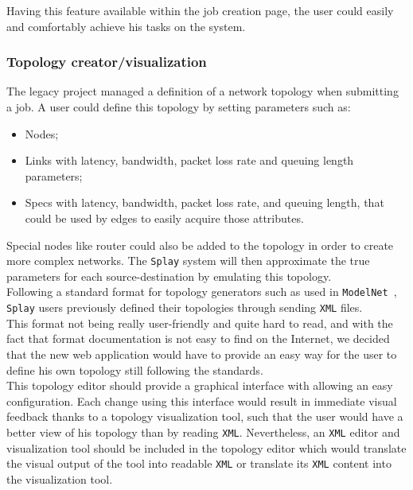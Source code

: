 \documentclass{eplmastersthesis}
\begin{document}
          Having this feature available within the job creation page, the user
          could easily and comfortably achieve his tasks on the system.

        \subsubsection{Topology creator/visualization}

          The legacy project managed a definition of a network topology when
          submitting a job. A user could define this topology by setting
          parameters such as:

          \begin{itemize}
            \item Nodes;
            \item Links with latency, bandwidth, packet loss rate and queuing
            length parameters;
            \item Specs with latency, bandwidth, packet loss rate, and queuing
            length, that could be used by edges to easily acquire those
            attributes.
          \end{itemize}

          Special nodes like router could also be added to the topology in order
          to create more complex networks. The \texttt{Splay} system will then
          approximate the true parameters for each source-destination by
          emulating this topology.\\

          Following a standard format for topology generators such as
          used in \texttt{ModelNet}~\cite{ModelNet}, \texttt{Splay} users previously
          defined their topologies through sending \texttt{XML} files.\\
          This format not being really user-friendly and quite hard to read,
          and with the fact that format documentation is not easy to find
          on the Internet, we decided that the new web application would have
          to provide an easy way for the user to define his own topology
          still following the standards.\\

          This topology editor should provide a graphical interface with
          allowing an easy configuration. Each change using this interface
          would result in immediate visual feedback thanks to a topology
          visualization tool, such that the user would have a better view of
          his topology than by reading \texttt{XML}. Nevertheless, an \texttt{XML} editor and
          visualization tool should be included in the topology editor which
          would translate the visual output of the tool into readable \texttt{XML} or
          translate its \texttt{XML} content into the visualization tool.\\
\end{document}
